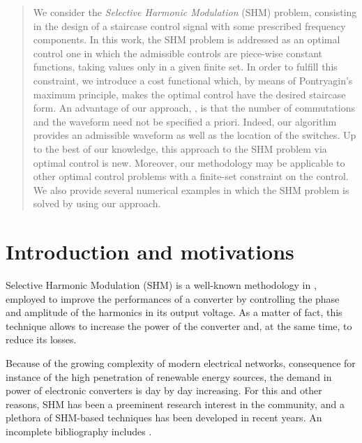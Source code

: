 \documentclass[twocolumn]{autart}    %
\begin{document}
\begin{frontmatter}
\begin{abstract}                          %
We consider the \emph{Selective Harmonic Modulation} (SHM) problem, consisting in the design of a staircase control signal with some prescribed frequency components. In this work, the SHM problem is addressed as an optimal control one in which the admissible controls are piece-wise constant functions, taking values only in a given finite set. In order to fulfill this constraint, we  introduce a cost functional  which, by means of Pontryagin's maximum principle, makes the optimal control have the desired staircase form. An advantage of our approach, , is that the number of commutations and the waveform need not be specified a priori. Indeed, our algorithm provides an admissible waveform as well as the location of the switches. Up to the best of our knowledge, this approach to the SHM problem via optimal control is new. Moreover, our methodology may be applicable to other optimal control problems with a finite-set constraint on the control. We also provide several numerical examples in which the SHM problem is solved by using our approach.
\end{abstract}

\end{frontmatter}


\section{Introduction and motivations}\label{Section1}

Selective Harmonic Modulation (SHM) \cite{Rodriguez2002} is a well-known methodology in , employed to improve the performances of a converter by controlling the phase and amplitude of the harmonics in its output voltage. As a matter of fact, this technique allows to increase the power of the converter and, at the same time, to reduce its losses. 

Because of the growing complexity of modern electrical networks, consequence for instance of the high penetration of renewable energy sources, the demand in power of electronic converters is day by day increasing. For this and other reasons, SHM has been a preeminent research interest in the  community, and a plethora of SHM-based techniques has been developed in recent years. An incomplete bibliography includes \cite{duranay2017selective,Janabi2020,Yang2017}.
\end{document}
